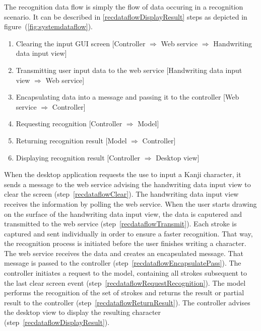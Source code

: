 The recognition data flow is simply the flow of data occuring in a recognition 
scenario. It can be described in \ref{recdataflowDisplayResult} steps
as depicted in figure~(\ref{fig:systemdataflow}).
\begin{enumerate}
  \item \label{recdataflowClear} 
        Clearing the input GUI screen 
        [Controller $\Rightarrow$ Web service $\Rightarrow$ Handwriting data input view]
  \item \label{recdataflowTransmit} 
        Transmitting user input data to the web service 
        [Handwriting data input view $\Rightarrow$ Web service]
  \item \label{recdataflowEncapsulatePass} 
        Encapsulating data into a message and passing 
        it to the controller 
        [Web service $\Rightarrow$ Controller]
  \item \label{recdataflowRequestRecognition} 
        Requesting recognition 
        [Controller $\Rightarrow$ Model] 
  \item \label{recdataflowReturnResult} 
        Returning recognition result 
        [Model $\Rightarrow$ Controller] 
  \item \label{recdataflowDisplayResult} %
        Displaying recognition result 
        [Controller $\Rightarrow$ Desktop view]
\end{enumerate}
When the desktop application requests the use to input a Kanji 
character, it sends a message to the web service advising the handwriting data 
input view to clear the screen (step~\ref{recdataflowClear}). 
The handwriting data input view receives the information by polling the web 
service. 
When the user starts drawing on the surface of the handwriting data input view, 
the data is caputered and transmitted to the web service 
(step~\ref{recdataflowTransmit}).
Each stroke is captured and sent individually in order to ensure a faster 
recognition. That way, the recognition process is initiated before the
user finishes writing a character. The web service receives the data and 
creates an encapsulated message. That message is passed to the 
controller (step~\ref{recdataflowEncapsulatePass}).
The controller initiates a request to the model, containing all strokes
subsequent to the last clear screen 
event (step~\ref{recdataflowRequestRecognition}).
The model performs the recognition of the set of strokes and returns the result
or partial result to the controller (step~\ref{recdataflowReturnResult}).
The controller advises the desktop view to display the resulting character
(step~\ref{recdataflowDisplayResult}).

